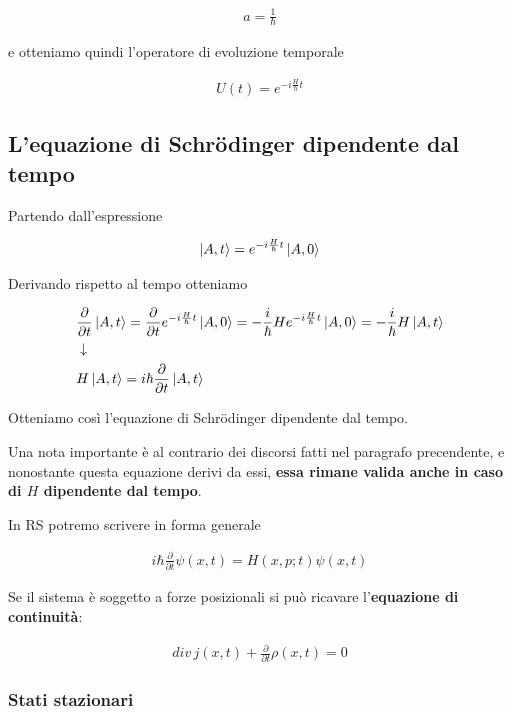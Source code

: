 \begin{align}
a=\frac{1}{\hbar}
\end{align}

e otteniamo quindi l'operatore di evoluzione temporale

\begin{align}
U(t)= e^{-i\frac{H}{\hbar}t}
\end{align}

\newpage
\subsection{L'equazione di Schrödinger dipendente dal tempo}

Partendo dall'espressione

\begin{align}
\ket{A,t}= e^{-i\frac{H}{\hbar}t} \ket{A,0}
\end{align}

Derivando rispetto al tempo otteniamo

\begin{align}
{}&\frac{\partial}{\partial t}\ket{A,t}= \frac{\partial}{\partial t}e^{-i\frac{H}{\hbar}t} \ket{A,0}=
-\frac{i}{\hbar}He^{-i\frac{H}{\hbar}t} \ket{A,0} = -\frac{i}{\hbar}H\ket{A,t}\\
&\downarrow \nonumber \\
&H\ket{A,t}= i\hbar\frac{\partial}{\partial t}\ket{A,t}
\end{align}

Otteniamo così l'equazione di Schrödinger dipendente dal tempo. 

Una nota importante è al contrario dei discorsi fatti nel paragrafo precendente, e nonostante questa equazione derivi da essi, \textbf{essa rimane valida anche in caso di $H$ dipendente dal tempo}.

In RS potremo scrivere in forma generale

\begin{align}
i\hbar \frac{\partial}{\partial t} \psi(x,t)= H(x,p;t)\psi(x,t)
\end{align}


Se il sistema è soggetto a forze posizionali si può ricavare l'\textbf{equazione di continuità}:

\begin{align}
div \, j(x,t) + \frac{\partial}{\partial t} \rho(x,t)=0
\end{align}


\subsubsection{Stati stazionari}

